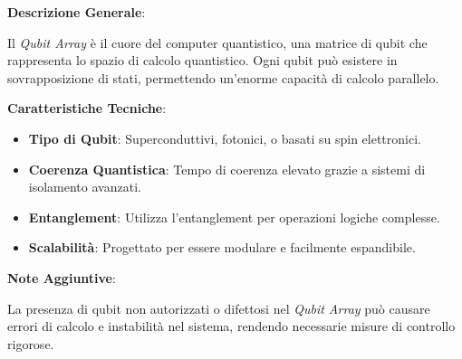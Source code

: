 \begin{tcolorbox}[colback=white,colframe=black,title=\textbf{Qubit Array}]
\begin{multicols}{2}
\textbf{Descrizione Generale}:

Il \emph{Qubit Array} è il cuore del computer quantistico, una matrice di qubit che rappresenta lo spazio di calcolo quantistico. Ogni qubit può esistere in sovrapposizione di stati, permettendo un'enorme capacità di calcolo parallelo.

\textbf{Caratteristiche Tecniche}:
\begin{itemize}
    \item \textbf{Tipo di Qubit}: Superconduttivi, fotonici, o basati su spin elettronici.
    \item \textbf{Coerenza Quantistica}: Tempo di coerenza elevato grazie a sistemi di isolamento avanzati.
    \item \textbf{Entanglement}: Utilizza l'entanglement per operazioni logiche complesse.
    \item \textbf{Scalabilità}: Progettato per essere modulare e facilmente espandibile.
\end{itemize}

\textbf{Note Aggiuntive}:

La presenza di qubit non autorizzati o difettosi nel \emph{Qubit Array} può causare errori di calcolo e instabilità nel sistema, rendendo necessarie misure di controllo rigorose.

\end{multicols}
\end{tcolorbox}

\vspace{0.5cm}

